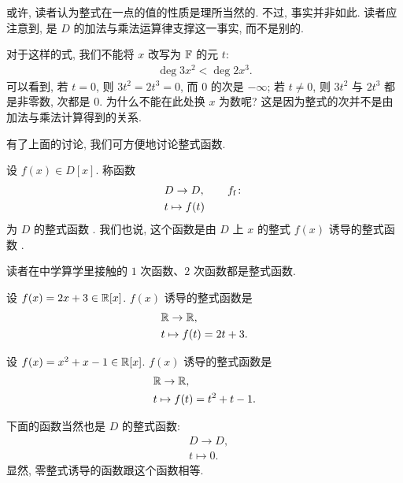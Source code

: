\begin{remark}
    或许, 读者认为整式在一点的值的性质是理所当然的. 不过, 事实并非如此. 读者应注意到, 是 $D$ 的加法与乘法运算律支撑这一事实, 而不是别的.

    对于这样的式, 我们不能将 $x$ 改写为 $\mathbb{F}$ 的元 $t$:
    \begin{align*}
        \deg 3x^2 < \deg 2x^3.
    \end{align*}
    可以看到, 若 $t=0$, 则 $3t^2 = 2t^3 = 0$, 而 $0$ 的次是 $-\infty$; 若 $t \neq 0$, 则 $3t^2$ 与 $2t^3$ 都是非零数, 次都是 $0$. 为什么不能在此处换 $x$ 为数呢? 这是因为整式的次并不是由加法与乘法计算得到的关系.
\end{remark}

有了上面的讨论, 我们可方便地讨论整式函数.

\begin{definition}
    设 $f(x) \in D[x]$. 称函数
    \begin{align*}
         & D \to D, \tag*{$f_\mathrm{f} \colon$} \\
         & t \mapsto f(t)
    \end{align*}
    为 $D$ 的整式函数 . 我们也说, 这个函数是由 $D$ 上 $x$ 的整式 $f(x)$ 诱导的整式函数 .
\end{definition}

读者在中学算学里接触的 $1$ 次函数、$2$ 次函数都是整式函数.

\begin{example}
    设 $f(x) = 2x + 3 \in \mathbb{R}[x]$. $f(x)$ 诱导的整式函数是
    \begin{align*}
         & \mathbb{R} \to \mathbb{R},             \\
         & t \mapsto f(t) = 2t + 3.
    \end{align*}
\end{example}

\begin{example}
    设 $f(x) = x^2 + x - 1 \in \mathbb{R}[x]$. $f(x)$ 诱导的整式函数是
    \begin{align*}
         & \mathbb{R} \to \mathbb{R},                  \\
         & t \mapsto f(t) = t^2 + t - 1.
    \end{align*}
\end{example}

\begin{example}
    下面的函数当然也是 $D$ 的整式函数:
    \begin{align*}
         & D \to D,     \\
         & t \mapsto 0.
    \end{align*}
    显然, 零整式诱导的函数跟这个函数相等.
\end{example}

